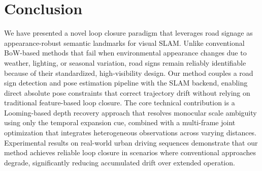 \documentclass[runningheads]{llncs}
\begin{document}
\section{Conclusion}
We have presented a novel loop closure paradigm that leverages road signage as
appearance-robust semantic landmarks for visual SLAM. Unlike conventional BoW-based
methods that fail when environmental appearance changes due to weather, lighting,
or seasonal variation, road signs remain reliably identifiable because of their
standardized, high-visibility design. Our method couples a road sign detection and
pose estimation pipeline with the SLAM backend, enabling direct absolute pose
constraints that correct trajectory drift without relying on traditional feature-based
loop closure. The core technical contribution is a Looming-based depth recovery
approach that resolves monocular scale ambiguity using only the temporal expansion
cue, combined with a multi-frame joint optimization that integrates heterogeneous
observations across varying distances. Experimental results on real-world urban
driving sequences demonstrate that our method achieves reliable loop closure in
scenarios where conventional approaches degrade, significantly reducing accumulated
drift over extended operation.

\nocite{*}


\end{document}
